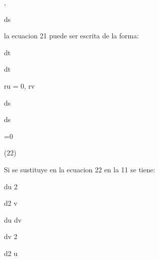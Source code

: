 \documentclass[a4paper,portrait,12pt]{article}
\begin{document}
,


\begin{flushleft}
ds
\end{flushleft}





\begin{flushleft}
la ecuacion 21 puede ser escrita de la forma:
\end{flushleft}


\begin{flushleft}
dt
\end{flushleft}


\begin{flushleft}
dt
\end{flushleft}


\begin{flushleft}
ru = 0, rv
\end{flushleft}


\begin{flushleft}
ds
\end{flushleft}


\begin{flushleft}
ds
\end{flushleft}





=0





(22)





\begin{flushleft}
Si se sustituye en la ecuacion 22 en la 11 se tiene:
\end{flushleft}


\begin{flushleft}
du 2
\end{flushleft}


\begin{flushleft}
d2 v
\end{flushleft}


\begin{flushleft}
du dv
\end{flushleft}


\begin{flushleft}
dv 2
\end{flushleft}


\begin{flushleft}
d2 u
\end{flushleft}
\end{document}
